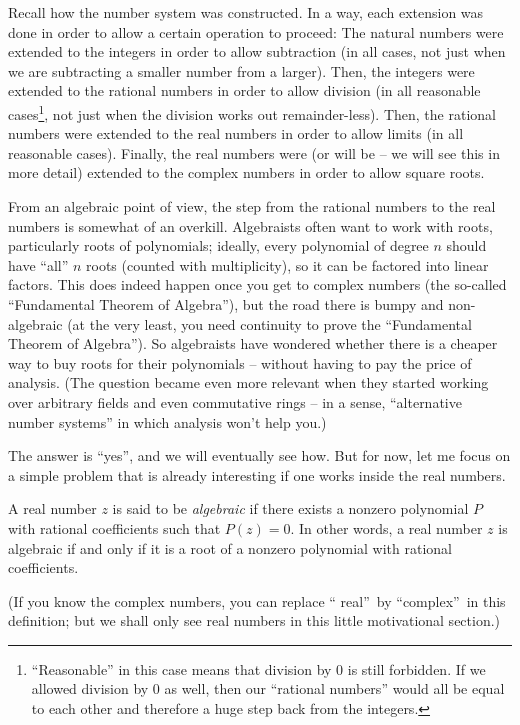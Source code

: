 \documentclass[numbers=enddot,12pt,final,onecolumn,notitlepage]{scrartcl}%
\numberwithin{exer}{subsection}
\theoremstyle{definition}
\newenvironment{noncompile}{}{}
\begin{document}
\begin{noncompile}
Recall how the number system was constructed. In a way, each extension was
done in order to allow a certain operation to proceed: The natural numbers
were extended to the integers in order to allow subtraction (in all cases, not
just when we are subtracting a smaller number from a larger). Then, the
integers were extended to the rational numbers in order to allow division (in
all reasonable cases\footnote{``Reasonable'' in this case means that division
by $0$ is still forbidden. If we allowed division by $0$ as well, then our
``rational numbers'' would all be equal to each other and therefore a huge
step back from the integers.}, not just when the division works out
remainder-less). Then, the rational numbers were extended to the real numbers
in order to allow limits (in all reasonable cases). Finally, the real numbers
were (or will be -- we will see this in more detail) extended to the complex
numbers in order to allow square roots.

From an algebraic point of view, the step from the rational numbers to the
real numbers is somewhat of an overkill. Algebraists often want to work with
roots, particularly roots of polynomials; ideally, every polynomial of degree
$n$ should have ``all'' $n$ roots (counted with multiplicity), so it can be
factored into linear factors. This does indeed happen once you get to complex
numbers (the so-called ``Fundamental Theorem of Algebra''), but the road there
is bumpy and non-algebraic (at the very least, you need continuity to prove
the ``Fundamental Theorem of Algebra''). So algebraists have wondered whether
there is a cheaper way to buy roots for their polynomials -- without having to
pay the price of analysis. (The question became even more relevant when they
started working over arbitrary fields and even commutative rings -- in a
sense, ``alternative number systems'' in which analysis won't help you.)

The answer is ``yes'', and we will eventually see how. But for now, let me
focus on a simple problem that is already interesting if one works inside the
real numbers.
\end{noncompile}

A real number $z$ is said to be \textit{algebraic} if there exists a nonzero
polynomial $P$ with rational coefficients such that $P\left(  z \right)  = 0$.
In other words, a real number $z$ is algebraic if and only if it is a root of
a nonzero polynomial with rational coefficients.

(If you know the complex numbers, you can replace \textquotedblleft
real\textquotedblright\ by \textquotedblleft complex\textquotedblright\ in
this definition; but we shall only see real numbers in this little
motivational section.)
\end{document}
